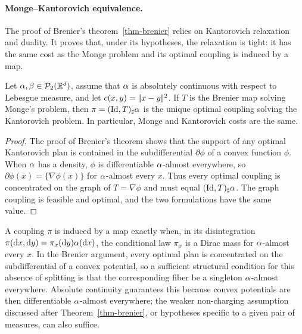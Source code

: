 \paragraph{Monge--Kantorovich equivalence.}

The proof of Brenier's theorem~\ref{thm-brenier} relies on Kantorovich relaxation and duality. It proves that, under its hypotheses, the relaxation is tight: it has the same cost as the Monge problem and its optimal coupling is induced by a map.

\begin{cor}\label{cor-monge-kantorovich-brenier}
		Let $\alpha,\beta\in\mathcal{P}_2(\mathbb{R}^d)$, assume that $\alpha$ is absolutely continuous with respect to Lebesgue measure, and let $c(x,y)=|\!| x-y |\!|^2$. If $T$ is the Brenier map solving Monge's problem, then $\pi=(\mathrm{Id},T)_\sharp\alpha$ is the unique optimal coupling solving the Kantorovich problem. In particular, Monge and Kantorovich costs are the same.
\end{cor}
\begin{proof}
	The proof of Brenier's theorem shows that the support of any optimal Kantorovich plan is contained in the subdifferential $\partial\phi$ of a convex function $\phi$. When $\alpha$ has a density, $\phi$ is differentiable $\alpha$-almost everywhere, so $\partial\phi(x)=\{\nabla\phi(x)\}$ for $\alpha$-almost every $x$. Thus every optimal coupling is concentrated on the graph of $T=\nabla\phi$ and must equal $(\mathrm{Id},T)_\sharp\alpha$. The graph coupling is feasible and optimal, and the two formulations have the same value.
\end{proof}

A coupling $\pi$ is induced by a map exactly when, in its disintegration $\pi(\mathrm{d} x,\mathrm{d} y)=\pi_x(\mathrm{d} y)\alpha(\mathrm{d} x)$, the conditional law $\pi_x$ is a Dirac mass for $\alpha$-almost every $x$. In the Brenier argument, every optimal plan is concentrated on the subdifferential of a convex potential, so a sufficient structural condition for this absence of splitting is that the corresponding fiber be a singleton $\alpha$-almost everywhere. Absolute continuity guarantees this because convex potentials are then differentiable $\alpha$-almost everywhere; the weaker non-charging assumption discussed after Theorem~\ref{thm-brenier}, or hypotheses specific to a given pair of measures, can also suffice.

